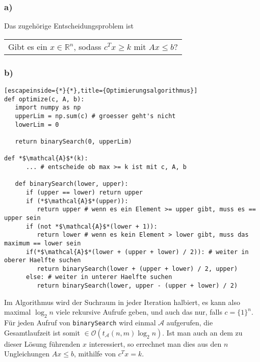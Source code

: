\documentclass{article}
\begin{document}
\subsubsection{a)}

Das zugehörige Entscheidungsproblem ist

\begin{center}
   \begin{tabular}{p{}}
      Gibt es ein $x\in\mathbb{R}^n$, sodass $c^Tx \ge k$ mit $Ax \le b$?
   \end{tabular}
\end{center}

\subsubsection{b)}

\begin{lstlisting}[escapeinside={*}{*},title={Optimierungsalgorithmus}]
def optimize(c, A, b):
   import numpy as np
   upperLim = np.sum(c) # groesser geht's nicht
   lowerLim = 0

   return binarySearch(0, upperLim)

def *$\mathcal{A}$*(k):
      ... # entscheide ob max >= k ist mit c, A, b

   def binarySearch(lower, upper):
      if (upper == lower) return upper
      if (*$\mathcal{A}$*(upper)):
         return upper # wenn es ein Element >= upper gibt, muss es == upper sein
      if (not *$\mathcal{A}$*(lower + 1)):
         return lower # wenn es kein Element > lower gibt, muss das maximum == lower sein
      if(*$\mathcal{A}$*(lower + (upper + lower) / 2)): # weiter in oberer Haelfte suchen
         return binarySearch(lower + (upper + lower) / 2, upper)
      else: # weiter in unterer Haelfte suchen
         return binarySearch(lower, upper - (upper + lower) / 2)
\end{lstlisting}

Im Algorithmus wird der Suchraum in jeder Iteration halbiert, es kann also
maximal $\log_2{n}$ viele rekursive Aufrufe geben, und auch das nur, falls $c =
\{1\}^n$. Für jeden Aufruf von \texttt{binarySearch} wird einmal $\mathcal{A}$
aufgerufen, die Gesamtlaufzeit ist somit
$\in\mathcal{O}\left(t_{\mathcal{A}}(n,m)\log_2{n}\right)$. Ist man auch an dem
zu dieser Lösung führenden $x$ interessiert, so errechnet man dies aus den $n$
Ungleichungen $Ax \le b$, mithilfe von $c^Tx = k$.
\end{document}
